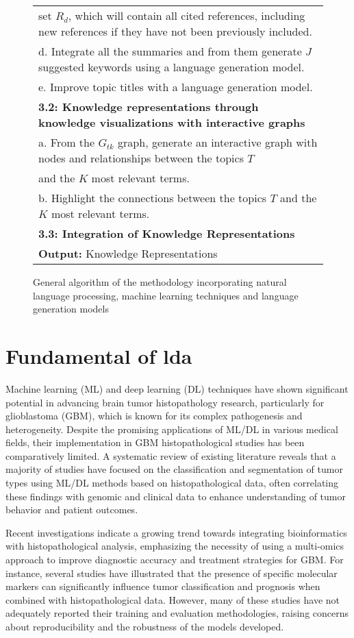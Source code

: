 \documentclass[runningheads]{llncs}
\begin{document}
\begin{figure*}[!h]
{\begin{tabular}{l}
			\quad \quad \quad set $R_d$, which will contain all cited references, including new references if they have not been previously included.\\
			\quad \quad d. Integrate all the summaries and from them generate $J$ suggested keywords using a language generation model.\\
			\quad \quad e. Improve topic titles with a language generation model.\\
			\quad \textbf{3.2: Knowledge representations through knowledge visualizations with interactive graphs}\\
			\quad \quad a. From the $G_{tk}$ graph, generate an interactive graph with nodes and relationships between the topics $T$\\
			\quad \quad and the $K$ most relevant terms.\\
			\quad \quad b. Highlight the connections between the topics $T$ and the $K$ most relevant terms.\\
			\quad \textbf{3.3: Integration of Knowledge Representations}\\
			\hline
			\textbf{Output:} Knowledge Representations \\
			\hline
		\end{tabular}
	}
	\caption{\centering General algorithm of the methodology incorporating natural language processing, machine learning techniques and language generation models}
	\label{tab:Algorithm}
\end{figure*}

\FloatBarrier


\section{Fundamental of lda}
Machine learning (ML) and deep learning (DL) techniques have shown significant potential in advancing brain tumor histopathology research, particularly for glioblastoma (GBM), which is known for its complex pathogenesis and heterogeneity. Despite the promising applications of ML/DL in various medical fields, their implementation in GBM histopathological studies has been comparatively limited. A systematic review of existing literature reveals that a majority of studies have focused on the classification and segmentation of tumor types using ML/DL methods based on histopathological data, often correlating these findings with genomic and clinical data to enhance understanding of tumor behavior and patient outcomes. 

Recent investigations indicate a growing trend towards integrating bioinformatics with histopathological analysis, emphasizing the necessity of using a multi-omics approach to improve diagnostic accuracy and treatment strategies for GBM. For instance, several studies have illustrated that the presence of specific molecular markers can significantly influence tumor classification and prognosis when combined with histopathological data. However, many of these studies have not adequately reported their training and evaluation methodologies, raising concerns about reproducibility and the robustness of the models developed. 
\end{document}
